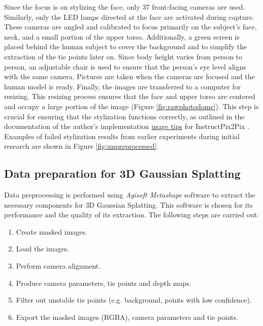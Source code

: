 Since the focus is on stylizing the face, only 37 front-facing cameras are used. Similarly, only the LED lamps directed at the face are activated during capture. These cameras are angled and calibrated to focus primarily on the subject's face, neck, and a small portion of the upper torso. Additionally, a green screen is placed behind the human subject to cover the background and to simplify the extraction of the tie points later on. Since body height varies from person to person, an adjustable chair is used to ensure that the person's eye level aligns with the same camera.
Pictures are taken when the cameras are focused and the human model is ready. Finally, the images are transferred to a computer for resizing. This resizing process ensures that the face and upper torso are centered and occupy a large portion of the image (Figure \ref{fig:rawphotodome}). This step is crucial for ensuring that the stylization functions correctly, as outlined in the documentation of the author's implementation \href{https://github.com/timothybrooks/instruct-pix2pix?tab=readme-ov-file#tips}{usage tips} for InstructPix2Pix \citep{Brooks.2023}. Examples of failed stylization results from earlier experiments during initial research are shown in Figure \ref{fig:unpreprocessed}.


\subsection{Data preparation for 3D Gaussian Splatting}
\label{sec:preprocessing}

Data preprocessing is performed using \textit{Agisoft Metashape} software to extract the necessary components for 3D Gaussian Splatting. This software is chosen for its performance and the quality of its extraction. The following steps are carried out:


\begin{enumerate}[noitemsep]
	\item Create masked images.
	\item Load the images.
	\item Perform camera alignment.
	\item Produce camera parameters, tie points and depth maps.
	\item Filter out unstable tie points (e.g. background, points with low confidence).
	\item Export the masked images (RGBA), camera parameters and tie points.
\end{enumerate}


